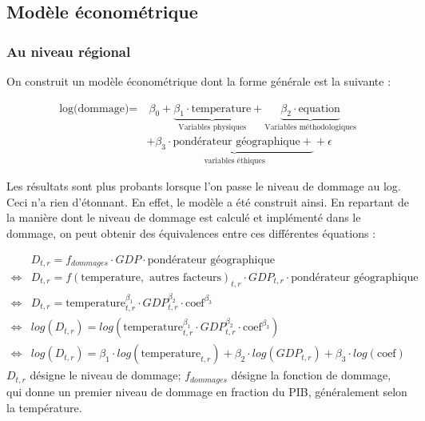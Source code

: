 \subsection{Modèle économétrique}

\subsubsection{Au niveau régional}


On construit un modèle économétrique dont la forme générale est la suivante : 


\begin{align}
\label{eq:modele}
    \text{log(dommage)} = & \ \beta_0  + \underbrace{\beta_1 \cdot \text{temperature}}_\text{Variables physiques}  + \underbrace{\beta_2 \cdot \text{equation}}_\text{Variables méthodologiques} \\
    & + \underbrace{ \beta_3 \cdot \text{pondérateur géographique} + }_\text{variables éthiques}  + \epsilon
    \end{align}


Les résultats sont plus probants lorsque l'on passe le niveau de dommage au log. Ceci n'a rien d'étonnant. En effet, le modèle a été construit ainsi. En repartant de la manière dont le niveau de dommage est calculé et implémenté dans le dommage, on peut obtenir des équivalences entre ces différentes équations : 

\begin{align*}
& D_{t,r} = f_{dommages} \cdot GDP \cdot \text{pondérateur géographique}\\
\iff & D_{t,r} = f(\text{temperature}, \text{ autres facteurs})_{t,r} \cdot GDP_{t,r} \cdot \text{pondérateur géographique} \\
\iff  & D_{t,r} = \text{temperature}_{t,r}^{\beta_1} \cdot GDP_{t,r}^{\beta_2} \cdot \text{coef}^{\beta_3} \\
\iff & log(D_{t,r}) = log(\text{temperature}_{t,r}^{\beta_1} \cdot GDP_{t,r}^{\beta_2} \cdot \text{coef}^{\beta_3}) \\
\iff & log(D_{t,r}) = \beta_1 \cdot log(\text{temperature}_{t,r}) + \beta_2 \cdot log(GDP_{t,r}) + \beta_3 \cdot log(\text{coef})
\end{align*}
$D_{t,r}$ désigne le niveau de dommage; $f_{dommages}$ désigne la fonction de dommage, qui donne un premier niveau de dommage en fraction du PIB, généralement selon la température.  \\

